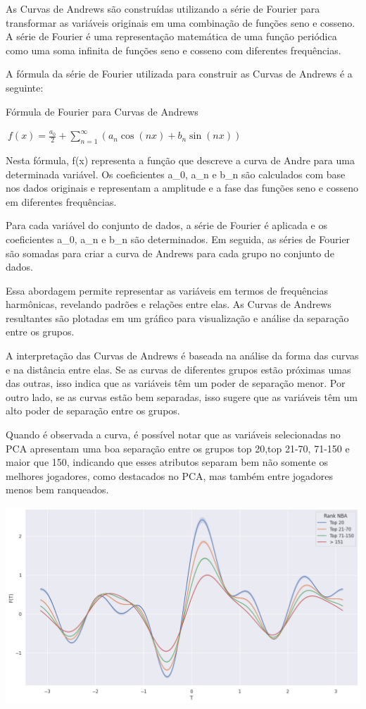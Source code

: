 \documentclass[
]{book}
\begin{document}
As Curvas de Andrews são construídas utilizando a série de Fourier para transformar as variáveis originais em uma combinação de funções seno e cosseno. A série de Fourier é uma representação matemática de uma função periódica como uma soma infinita de funções seno e cosseno com diferentes frequências.

A fórmula da série de Fourier utilizada para construir as Curvas de Andrews é a seguinte:

Fórmula de Fourier para Curvas de Andrews

\(\ f(x) = \frac{a_0}{2} + \sum_{n=1}^{\infty} \left( a_n \cos(nx) + b_n \sin(nx) \right)\)

Nesta fórmula, f(x) representa a função que descreve a curva de Andre para uma determinada variável. Os coeficientes a\_0, a\_n e b\_n são calculados com base nos dados originais e representam a amplitude e a fase das funções seno e cosseno em diferentes frequências.

Para cada variável do conjunto de dados, a série de Fourier é aplicada e os coeficientes a\_0, a\_n e b\_n são determinados. Em seguida, as séries de Fourier são somadas para criar a curva de Andrews para cada grupo no conjunto de dados.

Essa abordagem permite representar as variáveis em termos de frequências harmônicas, revelando padrões e relações entre elas. As Curvas de Andrews resultantes são plotadas em um gráfico para visualização e análise da separação entre os grupos.

A interpretação das Curvas de Andrews é baseada na análise da forma das curvas e na distância entre elas. Se as curvas de diferentes grupos estão próximas umas das outras, isso indica que as variáveis têm um poder de separação menor. Por outro lado, se as curvas estão bem separadas, isso sugere que as variáveis têm um alto poder de separação entre os grupos.

Quando é observada a curva, é possível notar que as variáveis selecionadas no PCA apresentam uma boa separação entre os grupos top 20,top 21-70, 71-150 e maior que 150, indicando que esses atributos separam bem não somente os melhores jogadores, como destacados no PCA, mas também entre jogadores menos bem ranqueados.

\includegraphics{imagens/7.png}
\end{document}
